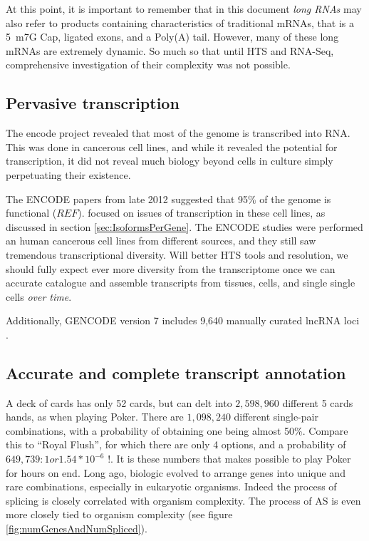   At this point, it is important to remember that in this document \textit{long RNAs} may also refer to products containing characteristics of traditional mRNAs, that is a 5\textprime~m7G Cap, ligated exons, and a Poly(A) tail. However, many of these long mRNAs are extremely dynamic. So much so that until HTS and RNA-Seq, comprehensive investigation of their complexity was not possible.

  \subsection{Pervasive transcription}

    The encode project revealed that most of the genome is transcribed into RNA. This was done in cancerous cell lines, and while it revealed the potential for transcription, it did not reveal much biology beyond cells in culture simply perpetuating their existence. 

    The ENCODE papers from late 2012 suggested that 95\% of the genome is functional ($REF$). \citet{Djebali2012} focused on issues of transcription in these cell lines, as discussed in section \ref{sec:IsoformsPerGene}. The ENCODE studies were performed an human cancerous cell lines from different sources, and they still saw tremendous transcriptional diversity. Will better HTS tools and resolution, we should fully expect ever more diversity from the transcriptome once we can accurate catalogue and assemble transcripts from tissues, cells, and single single cells \textit{over time}.

    Additionally, GENCODE version 7 includes 9,640 manually curated lncRNA loci \citep{Derrien2012}. 

  \subsection{Accurate and complete transcript annotation}

    A deck of cards has only 52 cards, but can delt into $2,598,960$ different 5 cards hands, as when playing Poker. There are $1,098,240$ different single-pair combinations, with a probability of obtaining one being almost 50\%. Compare this to ``Royal Flush'', for which there are only 4 options, and a probability of $649,739:1 or 1.54 * 10^{-6}$ !. It is these numbers that makes possible to play Poker for hours on end. Long ago, biologic evolved to arrange genes into unique and rare combinations, especially in eukaryotic organisms. Indeed the process of splicing is closely correlated with organism complexity. The process of AS is even more closely tied to organism complexity (see figure \ref{fig:numGenesAndNumSpliced}).

